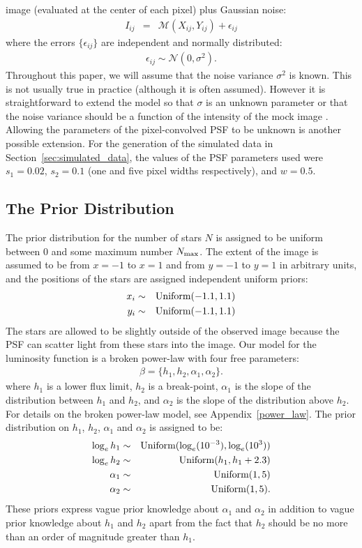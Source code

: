 \documentclass[manuscript]{aastex}
\begin{document}
image (evaluated at the center of each pixel) plus Gaussian noise:
\begin{eqnarray}
I_{ij} &=& \mathcal{M}(X_{ij}, Y_{ij}) + \epsilon_{ij}
\end{eqnarray}
where the errors $\{\epsilon_{ij}\}$ are independent and normally distributed:
\begin{eqnarray}
\epsilon_{ij} \sim \mathcal{N}(0, \sigma^2).
\end{eqnarray}
Throughout this paper, we will assume that the noise variance $\sigma^2$ is
known. This is not usually true in practice (although it is often assumed).
However it is straightforward to extend the model so that $\sigma$ is an
unknown parameter or that the noise variance should be a function of the
intensity of the mock image \citep[e.g.][]{2011MNRAS.412.2521B}. Allowing
the parameters of the pixel-convolved PSF to be unknown is another possible
extension. For the generation of the simulated data in Section~\ref{sec:simulated_data},
the values of the PSF parameters used were $s_1=0.02$, $s_2=0.1$ (one and
five pixel widths respectively), and $w=0.5$. 

\subsection{The Prior Distribution}
The prior distribution for the number of stars $N$ is assigned to be uniform
between 0 and some maximum number $N_{\rm max}$. The extent of the image is
assumed to be from $x=-1$ to $x=1$ and from $y=-1$ to $y=1$ in arbitrary units,
and the
positions of the stars are assigned independent uniform priors:
\begin{eqnarray}
x_i &\sim& \textnormal{Uniform}(-1.1, 1.1) \\
y_i &\sim& \textnormal{Uniform}(-1.1, 1.1)
\end{eqnarray}
The stars are allowed to be slightly outside of the observed image because the
PSF can scatter light from these stars into the image. Our model for the
luminosity function is a broken power-law with four
free parameters:
\begin{eqnarray}
\beta = \{h_1, h_2, \alpha_1, \alpha_2\}.
\end{eqnarray}
where $h_1$ is a lower flux limit, $h_2$ is a break-point, $\alpha_1$ is
the slope of the distribution between $h_1$ and $h_2$, and $\alpha_2$ is the
slope of the distribution above $h_2$. For details on the broken power-law
model, see Appendix~\ref{power_law}. The prior distribution on $h_1$, $h_2$,
$\alpha_1$ and $\alpha_2$ is assigned to be:
\begin{eqnarray}
\log_e h_1 &\sim& \textnormal{Uniform}(\log_e(10^{-3}), \log_e(10^3)) \\
\log_e h_2 &\sim& \textnormal{Uniform}(h_1, h_1 + 2.3) \\
\alpha_1 &\sim& \textnormal{Uniform}(1, 5) \\
\alpha_2 &\sim& \textnormal{Uniform}(1, 5).
\end{eqnarray}
These priors express vague prior knowledge about $\alpha_1$ and $\alpha_2$ in
addition to vague prior knowledge about $h_1$ and $h_2$ apart from the fact
that $h_2$ should be no more than an order of magnitude greater than $h_1$.
\end{document}
